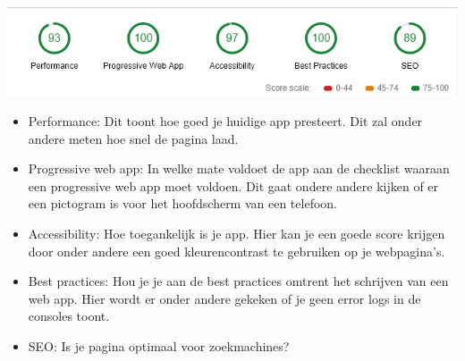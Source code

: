 	\includegraphics[scale=1]{img/audit.png}


\begin{itemize}  
	\item Performance: Dit toont hoe goed je huidige app presteert. Dit zal onder andere meten hoe snel de pagina laad.
	\item Progressive web app: In welke mate voldoet de app aan de checklist waaraan een progressive web app moet voldoen. Dit gaat ondere andere kijken of er een pictogram is voor het hoofdscherm van een telefoon.
	\item Accessibility: Hoe toegankelijk is je app. Hier kan je een goede score krijgen door onder andere een goed kleurencontrast te gebruiken op je webpagina's.
	\item Best practices: Hou je je aan de best practices omtrent het schrijven van een web app. Hier wordt er onder andere gekeken of je geen error logs in de consoles toont.
	\item SEO: Is je pagina optimaal voor zoekmachines?
\end{itemize}

